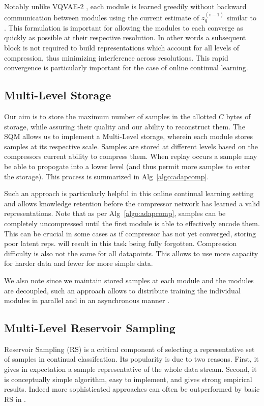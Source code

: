 \documentclass[colorinlistoftodos]{article} %
\begin{document}
Notably unlike VQVAE-2 \citep{razavi2019generating}, each module is learned greedily without backward communication between modules using the current estimate of $z_q^{(i-1)}$ similar to \cite{belilovsky2019decoupled,nokland2019training}. This formulation is important for allowing the modules to each converge as quickly as possible at their respective resolution. In other words a subsequent block is not required to build representations which account for all levels of compression, thus minimizing interference across resolutions. This rapid convergence is particularly important for the case of online continual learning. 

\subsection{Multi-Level Storage}
Our aim is to store the maximum number of samples in the allotted $C$ bytes of storage, while assuring their quality and our ability to reconstruct them. The SQM allows us to implement a Multi-Level storage, wherein each module stores samples at its respective scale. Samples are stored at different levels based on the compressors current ability to compress them. When replay occurs a sample may be able to propogate into a lower level (and thus permit more samples to enter the storage). This process is summarized in Alg~\ref{algo:adapcomp}. 

 Such an approach is particularly helpful in this online continual learning setting and allows knowledge retention before the compressor network has learned a valid representations. Note that as per Alg~\ref{algo:adapcomp}, samples can be completely uncompressed until the first module is able to effectively encode them.  This can be crucial in some cases as if compressor has not yet converged, storing poor latent reps. will result in this task being fully forgotten. Compression difficulty is also not the same for all datapoints. This allows to use more capacity for harder data and fewer for more simple data.

 We also note since we maintain stored samples at each module and the modules are decoupled, such an approach allows to distribute training the individual modules in parallel and in an asynchronous manner \citep{belilovsky2019decoupled}.


\subsection{Multi-Level Reservoir Sampling}
Reservoir Sampling (RS) is a critical component of selecting a representative set of samples in continual classifcation\cite{chaudhry2019continual}. Its popularity is due to two reasons. First, it gives in expectation a sample representative of the whole data stream.  Second, it is conceptually simple algorithm, easy to implement, and gives strong empirical results. Indeed more sophisticated approaches can often be outperformed by basic RS in \cite{chaudhry2019continual}.
\end{document}
